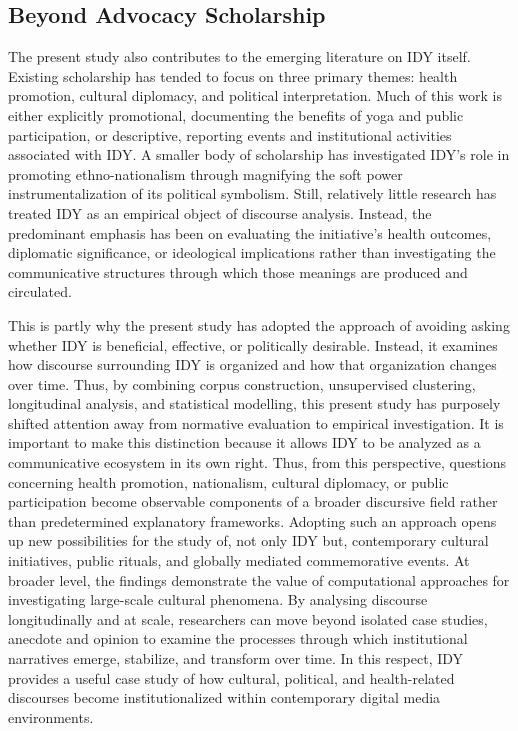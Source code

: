 \documentclass[11pt]{article}
\begin{document}
{\subsection{Beyond Advocacy Scholarship}

The present study also contributes to the emerging literature on IDY itself. Existing scholarship has tended to focus on three primary themes: health promotion, cultural diplomacy, and political interpretation. Much of this work is either explicitly promotional, documenting the benefits of yoga and public participation, or descriptive, reporting events and institutional activities associated with IDY. A smaller body of scholarship has investigated IDY's role in promoting ethno-nationalism through magnifying the soft power instrumentalization of its political symbolism. Still, relatively little research has treated IDY as an empirical object of discourse analysis. Instead, the predominant emphasis has been on evaluating the initiative's health outcomes, diplomatic significance, or ideological implications rather than investigating the communicative structures through which those meanings are produced and circulated.

This is partly why the present study has adopted the approach of avoiding asking whether IDY is beneficial, effective, or politically desirable. Instead, it examines how discourse surrounding IDY is organized and how that organization changes over time. Thus, by combining corpus construction, unsupervised clustering, longitudinal analysis, and statistical modelling, this present study has purposely shifted attention away from normative evaluation to empirical investigation. It is important to make this distinction because it allows IDY to be analyzed as a communicative ecosystem in its own right. Thus, from this perspective, questions concerning health promotion, nationalism, cultural diplomacy, or public participation become observable components of a broader discursive field rather than predetermined explanatory frameworks. Adopting such an approach opens up new possibilities for the study of, not only IDY but, contemporary cultural initiatives, public rituals, and globally mediated commemorative events. At broader level, the findings demonstrate the value of computational approaches for investigating large-scale cultural phenomena. By analysing discourse longitudinally and at scale, researchers can move beyond isolated case studies, anecdote and opinion to examine the processes through which institutional narratives emerge, stabilize, and transform over time. In this respect, IDY provides a useful case study of how cultural, political, and health-related discourses become institutionalized within contemporary digital media environments.


}
\end{document}
